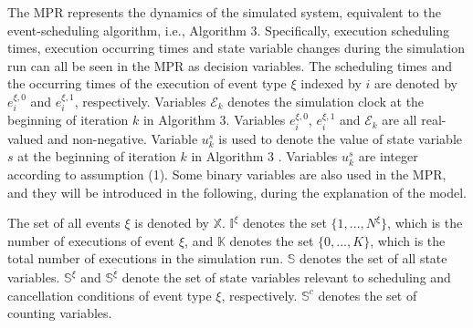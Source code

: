 \documentclass[suppldata]{interact}
\theoremstyle{plain}
\theoremstyle{definition}
\theoremstyle{remark}
\begin{document}
The MPR represents the dynamics of the simulated system, equivalent to the event-scheduling algorithm, i.e., Algorithm 3. Specifically, execution scheduling times, execution occurring times and state variable changes during the simulation run can all be seen in the MPR as decision variables. The scheduling times and the occurring times of the execution of event type $\xi$ indexed by $i$ are denoted by $e^{\xi,0}_{i}$ and $e^{\xi,1}_{i}$, respectively. Variables $\mathcal{E}_k$ denotes the simulation clock at the beginning of iteration $k$ in Algorithm 3. 
Variables $e^{\xi,0}_{i}$, $e^{\xi,1}_{i}$ and $\mathcal{E}_k$ are all real-valued and non-negative. Variable $u^s_k$ is used to denote the value of state variable $s$ at the beginning of iteration $k$ in Algorithm 3%
. Variables $u^s_k$ are integer according to assumption (1). Some binary variables are also used in the MPR, and they will be introduced in the following, during the explanation of the model. 

The set of all events $\xi$ is denoted by $\mathbb{X}$. $\mathbb{I}^{\xi}$ denotes the set $\{1,...,N^{\xi}\}$, which is the number of executions of event ${\xi}$, and $\mathbb{K}$ denotes the set $\{0,...,K\}$, which is the total number of executions in the simulation run. $\mathbb{S}$ denotes the set of all state variables. $\mathbb{S}^{\xi}$ and $\mathbb{S}^{\bar{\xi}}$ denote the set of state variables relevant to scheduling and cancellation conditions of event type ${\xi}$, respectively. $\mathbb{S}^{c}$ denotes the set of counting variables.
\end{document}
